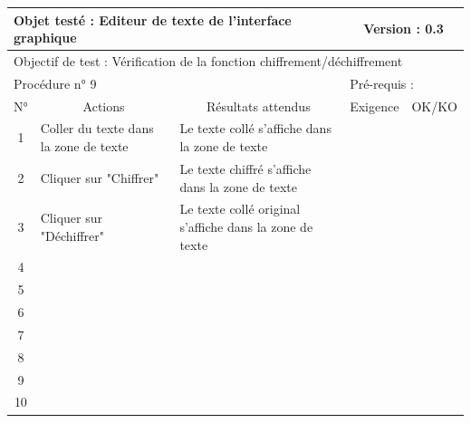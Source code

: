 \documentclass{../res/univ-projet}
\begin{document}
\begin{center}
    
    \begin{tabular}{|c|p{5cm}|p{5cm}|p{1.5cm}|p{1.5cm}|}
      \hline
      \multicolumn{3}{|l|}{Objet testé : Editeur de texte de l'interface graphique} & \multicolumn{2}{c|}{Version : 0.3}\\ \hline
      \multicolumn{5}{|l|}{Objectif de test : Vérification de la fonction chiffrement/déchiffrement}\\ \hline
      \multicolumn{3}{|l|}{Procédure n° 9} & \multicolumn{2}{p{3cm}|}{Pré-requis : }\\ \hline
      \multicolumn{1}{|c|}{N°} & \multicolumn{1}{c|}{Actions} & \multicolumn{1}{c|}{Résultats attendus} & 
      \multicolumn{1}{c|}{Exigence} & \multicolumn{1}{c|}{OK/KO}\\ \hline
      1 & Coller du texte dans la zone de texte & Le texte collé s'affiche dans la zone de texte &  & \\
      2 & Cliquer sur "Chiffrer" & Le texte chiffré s'affiche dans la zone de texte &  & \\
      3 & Cliquer sur "Déchiffrer" & Le texte collé original s'affiche dans la zone de texte &  & \\
	  4 &  &  &  & \\
      5 &  &  &  & \\
	  6 &  &  &  & \\
      7 &  &  &  & \\
      8 &  &  &  & \\
      9 &  &  &  & \\
      10 &  &  &  &\\ 
    \hline
    \end{tabular}
    \vskip 2.2cm


\end{center}
\end{document}
